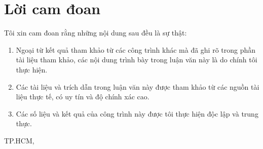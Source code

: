 \chapter*{Lời cam đoan}
Tôi xin cam đoan rằng những nội dung sau đều là sự thật:

\begin{enumerate}
    \item Ngoại từ kết quả tham khảo từ các công trình khác mà đã ghi rõ trong phần tài liệu tham khảo, các nội dung trình bày trong luận văn này là do chính tôi thực hiện.

    \item Các tài liệu và trích dẫn trong luận văn này được tham khảo từ các nguồn tài liệu thực tế, có uy tín và độ chính xác cao.

    \item Các số liệu và kết quả của công trình này được tôi thực hiện độc lập và trung thực.
\end{enumerate}

\bigskip
\bigskip

\begin{flushright}
TP.HCM, \csCompileTime

\bigskip
\bigskip
\bigskip
\bigskip

\csSVone
\end{flushright}
